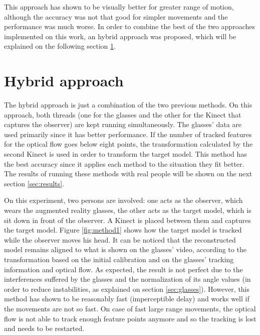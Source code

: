 \documentclass[msc, a4paper, classic, en]{ufbathesis}
\begin{document}
This approach has shown to be visually better for greater range of motion, although the accuracy was not that good for simpler movements and the performance was much worse. In order to combine the best of the two approaches implemented on this work, an hybrid approach was proposed, which will be explained on the following section \ref{sec:hybrid}.

\section{Hybrid approach}
\label{sec:hybrid}

The hybrid approach is just a combination of the two previous methods. On this approach, both threads (one for the glasses and the other for the Kinect that captures the observer) are kept running simultaneously. The glasses' data are used primarily since it has better performance. If the number of tracked features for the optical flow goes below eight points, the transformation calculated by the second Kinect is used in order to transform the target model. This method has the best accuracy since it applies each method to the situation they fit better. The results of running these methods with real people will be shown on the next section \ref{sec:results}. 

\label{sec:results}

On this experiment, two persons are involved: one acts as the observer, which wears the augmented reality glasses, the other acts as the target model, which is sit down in front of the observer. A Kinect is placed between them and captures the target model. Figure \ref{fig:method1} shows how the target model is tracked while the observer moves his head. It can be noticed that the reconstructed model remains aligned to what is shown on the glasses' video, according to the transformation based on the initial calibration and on the glasses' tracking information and optical flow. As expected, the result is not perfect due to the interferences suffered by the glasses and the normalization of its angle values (in order to reduce instabilities, as explained on section \ref{sec:glasses}). However, this method has shown to be reasonably fast (imperceptible delay) and works well if the movements are not so fast. On case of fast large range movements, the optical flow is not able to track enough feature points anymore and so the tracking is lost and needs to be restarted.
\end{document}
